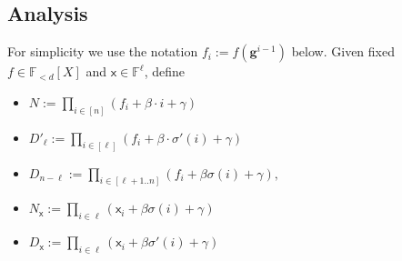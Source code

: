 \documentclass[11pt]{article} %
\newcommand{\F}{\ensuremath{\mathbb F}\xspace}
\newcommand{\defeq}{:=}
\newcommand{\inp}{\ensuremath{\mathsf{x}}\xspace}
\newcommand{\hgen}{\ensuremath{\mathbf{g}}\xspace}
\newcommand{\polysofdeg}[1]{\ensuremath{\F_{< #1}[X]}\xspace}
\begin{document}
\subsection{Analysis}


For simplicity we use the notation $f_i\defeq f(\hgen^{i-1})$ below.
Given fixed $f\in\polysofdeg{d}$ and $\inp\in \F^\ell$,
define
\begin{itemize}

\item $N \defeq \prod_{i\in [n]} (f_i + \beta\cdot i +\gamma)$
\item $D'_\ell \defeq \prod_{i\in [\ell]} (f_i + \beta\cdot \sigma'(i) +\gamma)$
\item $D_{n-\ell} \defeq \prod_{i\in [\ell+1..n]} (f_i + \beta\sigma(i) +\gamma),$
\item  $N_{\inp} \defeq \prod_{i\in \ell}(\inp_i + \beta\sigma(i) +\gamma)$
\item $D_{\inp} \defeq \prod_{i\in \ell}(\inp_i + \beta\sigma'(i) +\gamma)$

\end{itemize}
\end{document}

